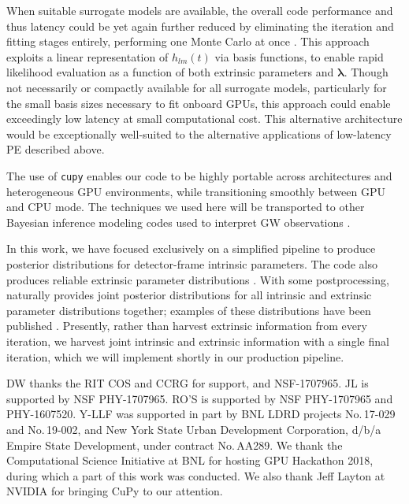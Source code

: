 \documentclass[twocolumn,prd,nofootinbib]{revtex4}
\newcommand\AddedResponse[1]{{\color{blue} {#1}}}
\begin{document}
When suitable surrogate models are available, the overall code performance and thus latency could be yet again further
reduced by eliminating the iteration and fitting stages entirely, performing one Monte Carlo at once
\cite{gwastro-PE-AlternativeArchitecturesROM}.  This approach exploits a linear representation of  $h_{lm}(t)$  via
basis functions, to enable rapid likelihood evaluation as a function of both extrinsic parameters and  $\bm{\lambda}$.
Though not necessarily or compactly available for all surrogate models, particularly for the small basis sizes necessary
to fit onboard GPUs, this approach could enable exceedingly low latency at small computational cost.  This alternative
architecture would be exceptionally well-suited to the alternative applications of low-latency PE described above. 

The use of \texttt{cupy} enables our code to be highly portable across architectures and heterogeneous GPU environments,
while transitioning smoothly between GPU and CPU mode.     The techniques we used here will be transported to other
Bayesian inference modeling codes used to interpret GW observations \cite{gwastro-PopulationReconstruct-Parametric-Wysocki2018,gwastro-PopulationReconstruct-Code-PopModels}.


\AddedResponse{In this work, we have focused exclusively on a simplified pipeline  to produce posterior distributions
  for detector-frame intrinsic parameters.   The  code  also produces
reliable extrinsic parameter distributions \cite{gwastro-PE-AlternativeArchitectures}.  With some postprocessing,
naturally provides joint posterior distributions for all intrinsic and extrinsic parameter distributions together;
examples of these distributions have been published \cite{LIGO-O2-Catalog}.  
Presently, rather than harvest extrinsic information from every iteration, we harvest joint intrinsic and
extrinsic information with a single final iteration, which we will implement shortly in our production pipeline.
}




\begin{acknowledgements}
DW thanks the RIT COS and CCRG for support, and  NSF-1707965.
JL is supported by NSF PHY-1707965.  
RO'S is supported by NSF PHY-1707965 and PHY-1607520.
Y-LLF was supported in part by BNL LDRD projects No.\,17-029 and No.\,19-002, 
and New York State Urban Development Corporation, d/b/a Empire State Development, under contract No.\,AA289.
We thank the Computational Science Initiative at BNL for hosting GPU Hackathon 2018, during which a part of this work was conducted. We also thank Jeff Layton at NVIDIA for bringing CuPy to our attention.
\end{acknowledgements}



\end{document}
